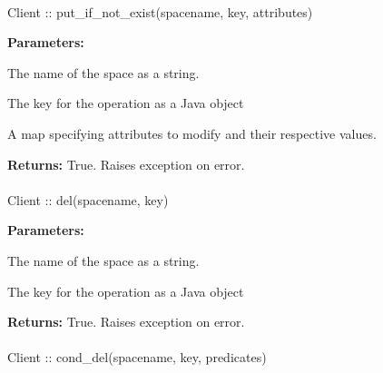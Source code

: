 \paragraph{}
\label{api:java:put_if_not_exist}
\begin{javacode}
Client :: put_if_not_exist(spacename, key, attributes)
\end{javacode}
\funcdesc 

\noindent\textbf{Parameters:}
\begin{description}[labelindent=\widthof{{\code{attributes}}},leftmargin=*,noitemsep,nolistsep,align=right]
\item[\code{spacename}] The name of the space as a string.
\item[\code{key}] The key for the operation as a Java object
\item[\code{attributes}] A map specifying attributes to modify and their respective values.
\end{description}

\noindent\textbf{Returns:}
True.  Raises exception on error.

\paragraph{}
\label{api:java:del}
\begin{javacode}
Client :: del(spacename, key)
\end{javacode}
\funcdesc 

\noindent\textbf{Parameters:}
\begin{description}[labelindent=\widthof{{\code{spacename}}},leftmargin=*,noitemsep,nolistsep,align=right]
\item[\code{spacename}] The name of the space as a string.
\item[\code{key}] The key for the operation as a Java object
\end{description}

\noindent\textbf{Returns:}
True.  Raises exception on error.

\paragraph{}
\label{api:java:cond_del}
\begin{javacode}
Client :: cond_del(spacename, key, predicates)
\end{javacode}
\funcdesc 


